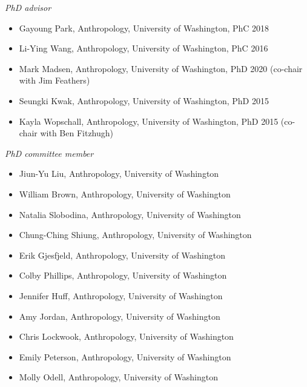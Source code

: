\medskip

\medskip

\noindent\emph{PhD advisor\vspace{0.01in}}

\medskip

\begin{itemize}[noitemsep, font=$\bullet$\scshape\bfseries]

\item Gayoung Park, Anthropology, University of Washington, PhC 2018

\item Li-Ying Wang, Anthropology, University of Washington, PhC 2016

\item Mark Madsen, Anthropology, University of Washington, PhD 2020 (co-chair with Jim Feathers)

\item Seungki Kwak, Anthropology, University of Washington, PhD 2015

\item Kayla Wopschall, Anthropology, University of Washington, PhD 2015 (co-chair with Ben Fitzhugh)

\end{itemize}

\medskip

\noindent\emph{PhD committee member\vspace{0.01in}}

\medskip

\begin{itemize}[noitemsep, font=$\bullet$\scshape\bfseries]

\item Jiun-Yu Liu, Anthropology, University of Washington

\item William Brown, Anthropology, University of Washington

\item Natalia Slobodina, Anthropology, University of Washington

\item Chung-Ching Shiung, Anthropology, University of Washington

\item Erik Gjesfjeld, Anthropology, University of Washington

\item Colby Phillips, Anthropology, University of Washington

\item Jennifer Huff, Anthropology, University of Washington

\item Amy Jordan, Anthropology, University of Washington

\item Chris Lockwook, Anthropology, University of Washington

\item Emily Peterson, Anthropology, University of Washington

\item Molly Odell, Anthropology, University of Washington

\end{itemize}

